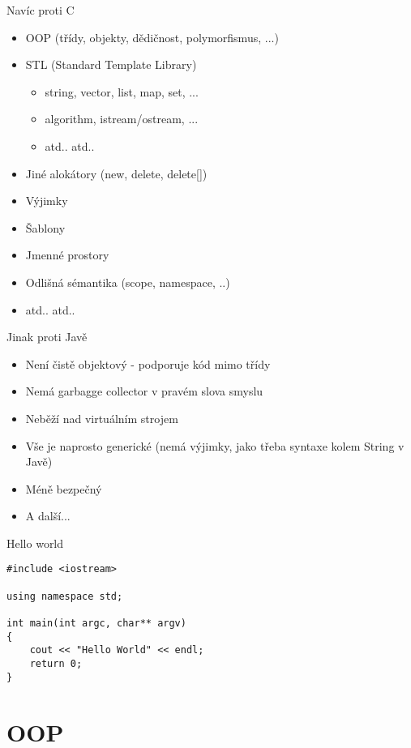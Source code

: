 \documentclass{beamer}
\begin{document}
\begin{xframe}{Navíc proti C}
	\begin{itemize}
		\item OOP (třídy, objekty, dědičnost, polymorfismus, ...)
		\item STL (Standard Template Library)
			\begin{itemize}
				\item string, vector, list, map, set, ...
				\item algorithm, istream/ostream, ...
				\item atd.. atd..
			\end{itemize}
		\item Jiné alokátory (new, delete, delete[])
		\item Výjimky
		\item Šablony
		\item Jmenné prostory
		\item Odlišná sémantika (scope, namespace, ..)
		\item atd.. atd..
	\end{itemize}
\end{xframe}

\begin{xframe}{Jinak proti Javě}
	\begin{itemize}
		\item Není čistě objektový - podporuje kód mimo třídy
		\item Nemá garbagge collector v pravém slova smyslu
		\item Neběží nad virtuálním strojem
		\item Vše je naprosto generické (nemá výjimky, jako třeba syntaxe kolem String v Javě)
		\item Méně bezpečný
		\item A další...
	\end{itemize}
\end{xframe}

\begin{xframe}{Hello world}
\begin{lstlisting}
#include <iostream>

using namespace std;

int main(int argc, char** argv)
{
    cout << "Hello World" << endl;
    return 0;
}
\end{lstlisting}
\end{xframe}

\section{OOP}
\end{document}
